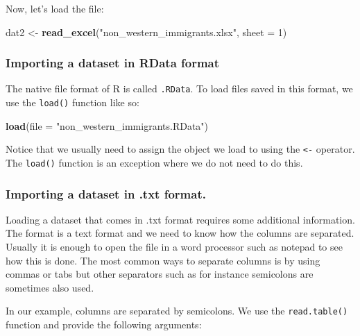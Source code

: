 \documentclass[]{article}
\newenvironment{Shaded}{\begin{snugshade}}{\end{snugshade}}
\newcommand{\DataTypeTok}[1]{\textcolor[rgb]{0.13,0.29,0.53}{#1}}
\newcommand{\DecValTok}[1]{\textcolor[rgb]{0.00,0.00,0.81}{#1}}
\newcommand{\KeywordTok}[1]{\textcolor[rgb]{0.13,0.29,0.53}{\textbf{#1}}}
\newcommand{\NormalTok}[1]{#1}
\newcommand{\StringTok}[1]{\textcolor[rgb]{0.31,0.60,0.02}{#1}}
\begin{document}
Now, let's load the file:

\begin{Shaded}
\begin{Highlighting}[]
\NormalTok{dat2 <-}\StringTok{ }\KeywordTok{read_excel}\NormalTok{(}\StringTok{"non_western_immigrants.xlsx"}\NormalTok{, }\DataTypeTok{sheet =} \DecValTok{1}\NormalTok{)}
\end{Highlighting}
\end{Shaded}

\hypertarget{importing-a-dataset-in-rdata-format}{%
\subsubsection{Importing a dataset in RData format}\label{importing-a-dataset-in-rdata-format}}

The native file format of R is called \texttt{.RData}. To load files saved in this format, we use the \texttt{load()} function like so:

\begin{Shaded}
\begin{Highlighting}[]
\KeywordTok{load}\NormalTok{(}\DataTypeTok{file =} \StringTok{"non_western_immigrants.RData"}\NormalTok{)}
\end{Highlighting}
\end{Shaded}

Notice that we usually need to assign the object we load to using the \texttt{\textless{}-} operator. The \texttt{load()} function is an exception where we do not need to do this.

\hypertarget{importing-a-dataset-in-.txt-format.}{%
\subsubsection{Importing a dataset in .txt format.}\label{importing-a-dataset-in-.txt-format.}}

Loading a dataset that comes in .txt format requires some additional information. The format is a text format and we need to know how the columns are separated. Usually it is enough to open the file in a word processor such as notepad to see how this is done. The most common ways to separate columns is by using commas or tabs but other separators such as for instance semicolons are sometimes also used.

In our example, columns are separated by semicolons. We use the \texttt{read.table()} function and provide the following arguments:
\end{document}
